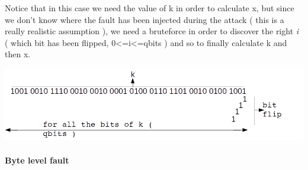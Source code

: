 \documentclass[11pt,english]{article}
\begin{document}
Notice that in this case we need the value of k in order to calculate x, but since we don't know where the fault has been injected during the attack ( this is a really realistic assumption ), we need a bruteforce in order to discover the right \textit{i} ( which bit has been flipped, 0<=i<=qbits ) and so to finally calculate k and then x.

\includegraphics[width=1.0\textwidth]{img/img_5.png} \\



\paragraph{Byte level fault}
\end{document}
